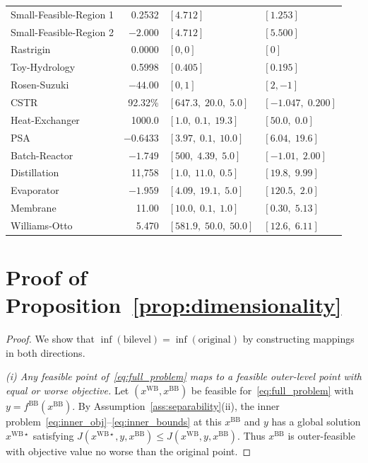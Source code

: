 \documentclass[12pt,a4paper]{article}%
\theoremstyle{plain}%
\theoremstyle{remark}%
\theoremstyle{definition}%
\def\WB{\mathrm{WB}}
\def\BB{\mathrm{BB}}
\providecommand{\DIFaddend}{} %
\DeclareRobustCommand{\DIFaddend}{\DIFOaddend \let\includegraphics\DIFOincludegraphics} %
\begin{document}
\begin{appendices}
\begin{table}[htbp]
\begin{tabular}{@{}lrll@{}}
\midrule
Small-Feasible-Region 1 & 0.2532 & $[4.712]$ & $[1.253]$ \\
Small-Feasible-Region 2 & $-2.000$ & $[4.712]$ & $[5.500]$ \\
Rastrigin & 0.0000 & $[0, 0]$ & $[0]$ \\
Toy-Hydrology & 0.5998 & $[0.405]$ & $[0.195]$ \\
Rosen-Suzuki & $-44.00$ & $[0, 1]$ & $[2, -1]$ \\
\midrule
CSTR & 92.32\% & $[647.3,\; 20.0,\; 5.0]$ & $[-1.047,\; 0.200]$ \\
Heat-Exchanger & 1000.0 & $[1.0,\; 0.1,\; 19.3]$ & $[50.0,\; 0.0]$ \\
PSA & $-0.6433$ & $[3.97,\; 0.1,\; 10.0]$ & $[6.04,\; 19.6]$ \\
Batch-Reactor & $-1.749$ & $[500,\; 4.39,\; 5.0]$ & $[-1.01,\; 2.00]$ \\
Distillation & 11{,}758 & $[1.0,\; 11.0,\; 0.5]$ & $[19.8,\; 9.99]$ \\
Evaporator & $-1.959$ & $[4.09,\; 19.1,\; 5.0]$ & $[120.5,\; 2.0]$ \\
Membrane & 11.00 & $[10.0,\; 0.1,\; 1.0]$ & $[0.30,\; 5.13]$ \\
Williams-Otto & 5.470 & $[581.9,\; 50.0,\; 50.0]$ & $[12.6,\; 6.11]$ \\
\bottomrule
\end{tabular}
\end{table}

\DIFaddend 

\section{Proof of Proposition~\ref{prop:dimensionality}}\label{sec:proof_dimensionality}

\begin{proof}
We show that $\inf(\text{bilevel}) = \inf(\text{original})$ by constructing mappings in both directions.

\emph{(i) Any feasible point of~\eqref{eq:full_problem} maps to a feasible outer-level point with equal or worse objective.}
Let $(x^{\WB}, x^{\BB})$ be feasible for~\eqref{eq:full_problem} with $y = f^{\BB}(x^{\BB})$. By Assumption~\ref{ass:separability}(ii), the inner problem~\eqref{eq:inner_obj}--\eqref{eq:inner_bounds} at this $x^{\BB}$ and $y$ has a global solution $x^{\WB\star}$ satisfying $J(x^{\WB\star}, y, x^{\BB}) \leq J(x^{\WB}, y, x^{\BB})$. Thus $x^{\BB}$ is outer-feasible with objective value no worse than the original point.


\end{proof}
\end{appendices}
\end{document}
